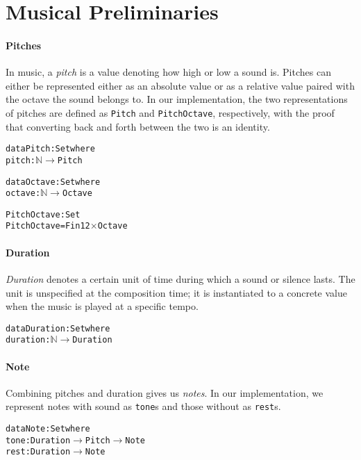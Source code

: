 \section{Musical Preliminaries}
\label{sec:music}

\paragraph{Pitches}
In music, a \emph{pitch} is a value denoting how high or low a sound is.
Pitches can either be represented either as an absolute value or as a
relative value paired with the octave the sound belongs to.
In our implementation, the two representations of pitches are defined
as \texttt{Pitch} and \texttt{PitchOctave}, respectively, with the proof
that converting back and forth between the two is an identity.

\begin{alltt}
data Pitch : Set where
  pitch : \(\mathbb{N}\) \(\rightarrow\) Pitch

data Octave : Set where
  octave : \(\mathbb{N}\) \(\rightarrow\) Octave

PitchOctave : Set
PitchOctave = Fin 12 \(\times\) Octave
\end{alltt}

\paragraph{Duration}
\emph{Duration} denotes a certain unit of time during which a sound
or silence lasts.
The unit is unspecified at the composition time; it is instantiated to
a concrete value when the music is played at a specific tempo.

\begin{alltt}
data Duration : Set where
  duration : \(\mathbb{N}\) \(\rightarrow\) Duration
\end{alltt}

\paragraph{Note}
Combining pitches and duration gives us \emph{notes}.
In our implementation, we represent notes with sound as \texttt{tone}s
and those without as \texttt{rest}s.

\begin{alltt}
data Note : Set where
  tone : Duration \(\rightarrow\) Pitch \(\rightarrow\) Note
  rest : Duration         \(\rightarrow\) Note
\end{alltt}


